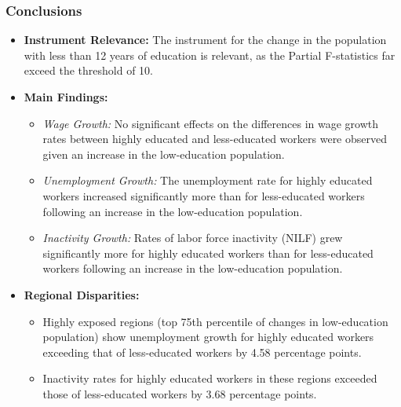 \begin{frame}
    \frametitle{Conclusions}
    \begin{itemize}
        \item \textbf{Instrument Relevance:} The instrument for the change in the population with less than 12 years of education is relevant, as the Partial F-statistics far exceed the threshold of 10.

        \vspace{0.3cm}
    
        \item \textbf{Main Findings:}
        \begin{itemize}
            \item \textit{Wage Growth:} No significant effects on the differences in wage growth rates between highly educated and less-educated workers were observed given an increase in the low-education population.
            \item \textit{Unemployment Growth:} The unemployment rate for highly educated workers increased significantly more than for less-educated workers following an increase in the low-education population.
            \item \textit{Inactivity Growth:} Rates of labor force inactivity (NILF) grew significantly more for highly educated workers than for less-educated workers following an increase in the low-education population.
        \end{itemize}
        \vspace{0.3cm}
    
        \item \textbf{Regional Disparities:}
        \begin{itemize}
            \item Highly exposed regions (top 75th percentile of changes in low-education population) show unemployment growth for highly educated workers exceeding that of less-educated workers by 4.58 percentage points.
            \item Inactivity rates for highly educated workers in these regions exceeded those of less-educated workers by 3.68 percentage points.
        \end{itemize}
    \end{itemize}
    \end{frame}
